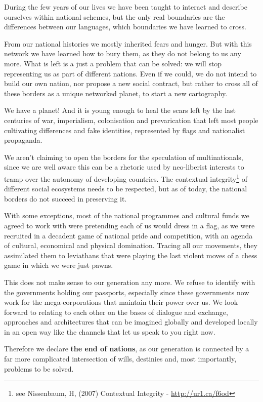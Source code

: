 During the few years of our lives we have been taught to interact and describe
ourselves within national schemes, but the only real boundaries are the
dif\hbox{}ferences between our languages, which boundaries we have learned to
cross.

From our national histories we mostly inherited fears and hunger. But with this
network we have learned how to bury them, as they do not belong to us any more.
What is left is a just a problem that can be solved: we will stop representing
us as part of dif\hbox{}ferent nations. Even if we could, we do not intend to
build our own nation, nor propose a new social contract, but rather to cross all
of these borders as a unique networked planet, to start a new cartography.

We have a planet! And it is young enough to heal the scars left by the last
centuries of war, imperialism, colonisation and prevarication that left most
people cultivating dif\hbox{}ferences and fake identities, represented by
f\hbox{}lags and nationalist propaganda.

We aren't claiming to open the borders for the speculation of multinationals,
since we are well aware this can be a rhetoric used by neo-liberist interests to
tramp over the autonomy of developing countries. The contextual
integrity\footnote{see Nissenbaum, H, (2007) Contextual Integrity -
\url{http://ur1.ca/f6od}} of dif\hbox{}ferent social ecosystems needs to be
respected, but as of today, the national borders do not succeed in preserving
it.

With some exceptions, most of the national programmes and cultural funds we
agreed to work with were pretending each of us would dress in a f\hbox{}lag, as
we were recruited in a decadent game of national pride and competition, with an
agenda of cultural, economical and physical domination. Tracing all our
movements, they assimilated them to leviathans that were playing the last
violent moves of a chess game in which we were just pawns.

This does not make sense to our generation any more. We refuse to identify with
the governments holding our passports, especially since these governments now
work for the mega-corporations that maintain their power over us. We look
forward to relating to each other on the bases of dialogue and exchange,
approaches and architectures that can be imagined globally and developed locally
in an open way like the channels that let us speak to you right now.

Therefore we declare \textbf{the end of nations}, as our generation is connected
by a far more complicated intersection of wills, destinies and, most
importantly, problems to be solved.


